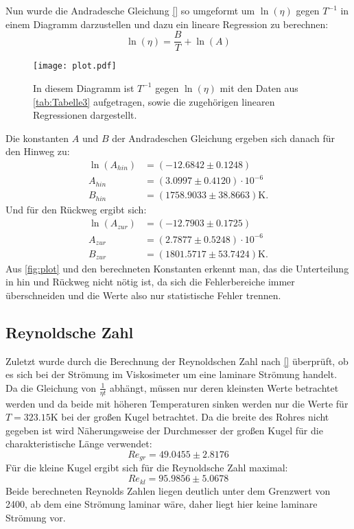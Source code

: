 Nun wurde die Andradesche Gleichung \eqref{} so umgeformt um $\ln\left(\eta\right)$ gegen $T^{-1}$ in einem Diagramm darzustellen und dazu ein lineare Regression zu berechnen:
\begin{equation*}
  \ln\left(\eta\right) = \frac{B}{T} + \ln\left(A\right)
\end{equation*}
\begin{figure}[H]
  \centering
  \texttt{[image: plot.pdf]}
  \caption{In diesem Diagramm ist $T^{-1}$ gegen $\ln\left(\eta\right)$ mit den Daten aus \autoref{tab:Tabelle3} aufgetragen, sowie die zugehörigen linearen Regressionen dargestellt.}
  \label{fig:plot}
\end{figure}
Die konstanten $A$ und $B$ der Andradeschen Gleichung ergeben sich danach für den Hinweg zu:
\begin{align*}
  \ln\left(A_{hin}\right) &= (-12.6842\pm 0.1248) \\
  A_{hin} &= (3.0997\pm 0.4120 ) \cdot 10^{-6} \\
  B_{hin} &= (1758.9033\pm 38.8663)\unit{\kelvin}.
\end{align*}
Und für den Rückweg ergibt sich:
\begin{align*}
  \ln\left(A_{zur}\right) &= (-12.7903\pm 0.1725) \\
  A_{zur} &= (2.7877\pm 0.5248 ) \cdot 10^{-6} \\
  B_{zur} &= (1801.5717\pm 53.7424)\unit{\kelvin}.
\end{align*}
Aus \autoref{fig:plot} und den berechneten Konstanten erkennt man, das die Unterteilung in hin und Rückweg nicht nötig ist, da sich die Fehlerbereiche
immer überschneiden und die Werte also nur statistische Fehler trennen.
\subsection{Reynoldsche Zahl}
Zuletzt wurde durch die Berechnung der Reynoldschen Zahl nach \eqref{} überprüft, ob es sich bei der
Strömung im Viskosimeter um eine laminare Strömung handelt. Da die Gleichung von $\frac{1}{\eta t}$ abhängt,
müssen nur deren kleinsten Werte betrachtet werden und da beide mit höheren Temperaturen sinken werden nur die Werte für
$T = 323.15\unit{\kelvin}$ bei der großen Kugel betrachtet. Da die breite des Rohres nicht gegeben ist wird Näherungsweise
der Durchmesser der großen Kugel für die charakteristische Länge verwendet:
\begin{equation*}
  Re_{gr} = 49.0455\pm 2.8176
\end{equation*}
Für die kleine Kugel ergibt sich für die Reynoldsche Zahl maximal:
\begin{equation*}
  Re_{kl} = 95.9856\pm 5.0678
\end{equation*}
Beide berechneten Reynolds Zahlen liegen deutlich unter dem Grenzwert von 2400, ab dem eine Strömung laminar wäre, daher liegt hier
keine laminare Strömung vor.